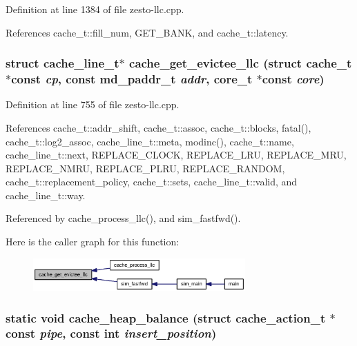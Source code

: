 Definition at line 1384 of file zesto-llc.cpp.

References cache\_\-t::fill\_\-num, GET\_\-BANK, and cache\_\-t::latency.
\subsubsection[{cache\_\-get\_\-evictee\_\-llc}]{\setlength{\rightskip}{0pt plus 5cm}struct {\bf cache\_\-line\_\-t}$\ast$ cache\_\-get\_\-evictee\_\-llc (struct {\bf cache\_\-t} $\ast$const  {\em cp}, \/  const {\bf md\_\-paddr\_\-t} {\em addr}, \/  {\bf core\_\-t} $\ast$const  {\em core})\hspace{0.3cm}{\tt  [read]}}\label{zesto-llc_8cpp_edb31cd34331b82f67b46e4117a3fb7a}




Definition at line 755 of file zesto-llc.cpp.

References cache\_\-t::addr\_\-shift, cache\_\-t::assoc, cache\_\-t::blocks, fatal(), cache\_\-t::log2\_\-assoc, cache\_\-line\_\-t::meta, modinc(), cache\_\-t::name, cache\_\-line\_\-t::next, REPLACE\_\-CLOCK, REPLACE\_\-LRU, REPLACE\_\-MRU, REPLACE\_\-NMRU, REPLACE\_\-PLRU, REPLACE\_\-RANDOM, cache\_\-t::replacement\_\-policy, cache\_\-t::sets, cache\_\-line\_\-t::valid, and cache\_\-line\_\-t::way.

Referenced by cache\_\-process\_\-llc(), and sim\_\-fastfwd().

Here is the caller graph for this function:\nopagebreak
\begin{figure}[H]
\begin{center}
\leavevmode
\includegraphics[width=230pt]{zesto-llc_8cpp_edb31cd34331b82f67b46e4117a3fb7a_icgraph}
\end{center}
\end{figure}
\subsubsection[{cache\_\-heap\_\-balance}]{\setlength{\rightskip}{0pt plus 5cm}static void cache\_\-heap\_\-balance (struct {\bf cache\_\-action\_\-t} $\ast$const  {\em pipe}, \/  const int {\em insert\_\-position})\hspace{0.3cm}{\tt  [static]}}\label{zesto-llc_8cpp_0784d914ca0e1dc0f651a456830f94ed}




